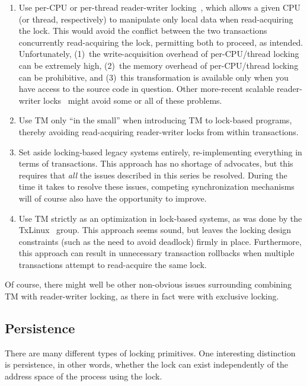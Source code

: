 \begin{enumerate}
\item	Use per-CPU or per-thread reader-writer
	locking~\cite{WilsonCHsieh92a}, which allows a
	given CPU (or thread, respectively) to manipulate only local
	data when read-acquiring the lock.
	This would avoid the conflict between the two transactions
	concurrently read-acquiring the lock, permitting both to proceed,
	as intended.
	Unfortunately, (1)~the write-acquisition overhead of
	per-CPU/thread locking can be extremely high, (2)~the memory
	overhead of per-CPU/thread locking can be prohibitive, and
	(3)~this transformation is available only when you have access to
	the source code in question.
	Other more-recent scalable
	reader-writer locks~\cite{YossiLev2009SNZIrwlock}
	might avoid some or all of these problems.
\item	Use TM only ``in the small'' when introducing TM to lock-based
	programs, thereby avoiding read-acquiring reader-writer locks
	from within transactions.
\item	Set aside locking-based legacy systems entirely, re-implementing
	everything in terms of transactions.
	This approach has no shortage of advocates, but this requires
	that \emph{all} the issues described in this series be resolved.
	During the time it takes to resolve these issues, competing
	synchronization mechanisms will of course also have the
	opportunity to improve.
\item	Use TM strictly as an optimization in lock-based systems, as was
	done by the TxLinux~\cite{ChistopherJRossbach2007a} group.
	This approach seems sound, but leaves the locking design
	constraints (such as the need to avoid deadlock) firmly in place.
	Furthermore, this approach can result in unnecessary transaction
	rollbacks when multiple transactions attempt to read-acquire
	the same lock.
\end{enumerate}

Of course, there might well be other non-obvious issues surrounding
combining TM with reader-writer locking, as there in fact were with
exclusive locking.

\subsection{Persistence}
\label{sec:future:Persistence}

There are many different types of locking primitives.
One interesting distinction is persistence, in other words, whether the
lock can exist independently of the address space of the process using
the lock.

